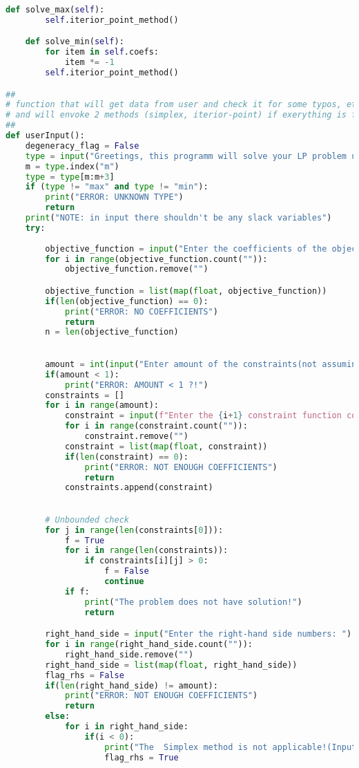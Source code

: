\documentclass[12pt, legalpaper]{exam}
\begin{document}
\begin{lstlisting}[language=Python, caption=Программа на Python, label=lst:python-code]
    def solve_max(self):
        self.iterior_point_method()

    def solve_min(self):
        for item in self.coefs:
            item *= -1
        self.iterior_point_method()

##
# function that will get data from user and check it for some typos, etc.
# and will envoke 2 methods (simplex, iterior-point) if exerything is fine =)
##
def userInput():
    degeneracy_flag = False
    type = input("Greetings, this programm will solve your LP problem using interior-point method.\nEnter the type of the problem(Max/Min): ").lower()
    m = type.index("m")
    type = type[m:m+3]
    if (type != "max" and type != "min"):
        print("ERROR: UNKNOWN TYPE")
        return
    print("NOTE: in input there shouldn't be any slack variables")
    try:
        
        objective_function = input("Enter the coefficients of the objective function: ").split(" ")
        for i in range(objective_function.count("")):
            objective_function.remove("")

        objective_function = list(map(float, objective_function))
        if(len(objective_function) == 0):
            print("ERROR: NO COEFFICIENTS")
            return
        n = len(objective_function)
        

        amount = int(input("Enter amount of the constraints(not assuming x>=0): "))
        if(amount < 1):
            print("ERROR: AMOUNT < 1 ?!")
        constraints = []
        for i in range(amount):
            constraint = input(f"Enter the {i+1} constraint function coefficients: ").split(" ")
            for i in range(constraint.count("")):
                constraint.remove("")
            constraint = list(map(float, constraint))
            if(len(constraint) == 0):
                print("ERROR: NOT ENOUGH COEFFICIENTS")
                return
            constraints.append(constraint)
        

        # Unbounded check
        for j in range(len(constraints[0])):
            f = True
            for i in range(len(constraints)):
                if constraints[i][j] > 0:
                    f = False
                    continue
            if f:
                print("The problem does not have solution!")
                return

        right_hand_side = input("Enter the right-hand side numbers: ").split(" ")
        for i in range(right_hand_side.count("")):
            right_hand_side.remove("")
        right_hand_side = list(map(float, right_hand_side))
        flag_rhs = False
        if(len(right_hand_side) != amount):
            print("ERROR: NOT ENOUGH COEFFICIENTS")
            return
        else:
            for i in right_hand_side:
                if(i < 0):
                    print("The  Simplex method is not applicable!(Input contain negative RHS value)")
                    flag_rhs = True


\end{lstlisting}
\end{document}
